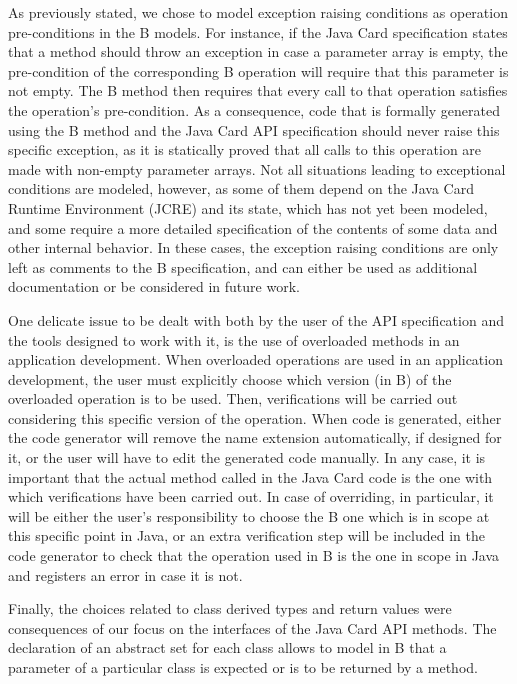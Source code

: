 \documentclass{entcs}
\begin{document}
As previously stated, we chose to model exception raising conditions
as operation pre-conditions in the B models. For instance, if the Java
Card specification states that a method should throw an exception in
case a parameter array is empty, the pre-condition of the
corresponding B operation will require that this parameter is not
empty. The B method then requires that every call to that operation
satisfies the operation's pre-condition. As a consequence, code that
is formally generated using the B method and the Java Card API
specification should never raise this specific exception, as it is
statically proved that all calls to this operation are made with
non-empty parameter arrays. Not all situations leading to exceptional
conditions are modeled, however, as some of them depend on the Java
Card Runtime Environment (JCRE) and its state, which has not yet been
modeled, and some require a more detailed specification of the
contents of some data and other internal behavior. In these cases, the
exception raising conditions are only left as comments to the B
specification, and can either be used as additional documentation or be
considered in future work.

One delicate issue to be dealt with both by the user of the API
specification and the tools designed to work with it, is the use of
overloaded methods in an application development. When overloaded
operations are used in an application development, the user must
explicitly choose which version (in B) of the overloaded operation is to be
used. Then, verifications will be carried out considering this
specific version of the operation. When code is generated, either the
code generator will remove the name extension automatically, if
designed for it, or the user will have to edit the generated code
manually. In any case, it is important that the actual method called
in the Java Card code is the one with which verifications have been
carried out.  In case of overriding, in particular, it will be either
the user's responsibility to choose the B one which is in scope at
this specific point in Java, or an extra verification step will be
included in the code generator to check that the operation used in
B is the one in scope in Java and registers an error in case it is
not.

Finally, the choices related to class derived types and return values were consequences of our focus on the interfaces of the Java Card API methods. The declaration of an abstract set for each class allows to model in B that a parameter of a particular class is expected or is to be returned by a method. 
\end{document}

